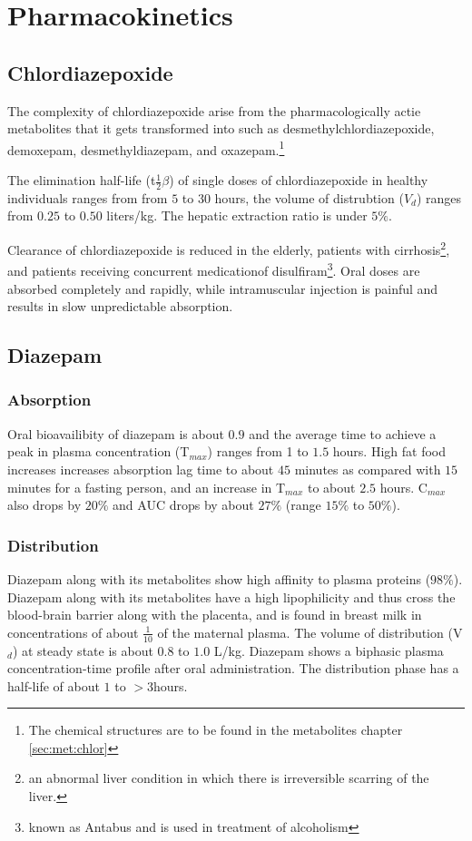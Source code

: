 \chapter{Pharmacokinetics}

\section{Chlordiazepoxide}
The complexity of chlordiazepoxide arise from the pharmacologically actie metabolites that it gets transformed into such as desmethylchlordiazepoxide, demoxepam, desmethyldiazepam, and oxazepam.\footnote{The chemical structures are to be found in the metabolites chapter \ref{sec:met:chlor}}

The elimination half-life (t$\frac{1}{2}\beta$) of single doses of chlordiazepoxide in healthy individuals ranges from from $5$ to $30$ hours, the volume of distrubtion ($V_d$) ranges from $0.25$ to $0.50$ liters/kg. The hepatic extraction ratio is under $5\%$.

Clearance of chlordiazepoxide is reduced in the elderly, patients with cirrhosis\footnote{an abnormal liver condition in which there is irreversible scarring of the liver.}, and patients receiving concurrent medicationof disulfiram\footnote{known as Antabus and is used in treatment of alcoholism}. Oral doses are absorbed completely and rapidly, while intramuscular injection is painful and results in slow unpredictable absorption.\cite{Greenblatt1978}  

\section{Diazepam}
\subsection{Absorption}
Oral bioavailibity of diazepam is about $0.9$ and the average time to achieve a peak in plasma concentration (T$_{max}$) ranges from 1 to $1.5$ hours. High fat food increases increases absorption lag time to about $45$ minutes as compared with $15$ minutes for a fasting person, and an increase in T$_{max}$ to about $2.5$ hours. C$_{max}$ also drops by $20\%$ and AUC drops by about $27\%$ (range $15\%$ to $50\%$).

\subsection{Distribution}
Diazepam along with its metabolites show high affinity to plasma proteins ($98\%$). Diazepam along with its metabolites have a high lipophilicity and thus cross the blood-brain barrier along with the placenta, and is found in breast milk in concentrations of about $\frac{1}{10}$ of the maternal plasma.
The volume of distribution (V$_d$) at steady state is about $0.8$ to $1.0$ L/kg. Diazepam shows a biphasic plasma concentration-time profile after oral administration. The  distribution phase has a half-life of about $1$ to $>3$hours.

